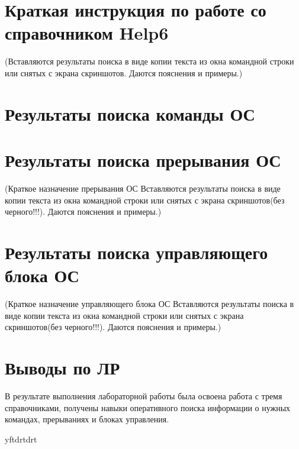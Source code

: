 \section{Краткая инструкция по работе со справочником Help6}
 (Вставляются результаты поиска в виде копии текста из окна командной строки или снятых с
 экрана скриншотов. Даются пояснения и примеры.)

\section{Результаты поиска команды ОС}


\section{Результаты поиска прерывания ОС}
(Краткое назначение прерывания ОС Вставляются результаты поиска в виде копии текста из
окна командной строки или снятых с экрана скриншотов(без черного!!!). Даются пояснения и
примеры.)

\section{Результаты поиска управляющего блока ОС}
(Краткое назначение управляющего блока ОС Вставляются результаты поиска в виде копии
текста из окна командной строки или снятых с экрана скриншотов(без черного!!!). Даются
пояснения и примеры.)

\section{Выводы по ЛР}
В результате выполнения лабораторной работы была освоена работа с тремя справочниками,
получены навыки оперативного поиска информации о нужных командах, прерываниях и блоках
управления.

yftdrtdrt